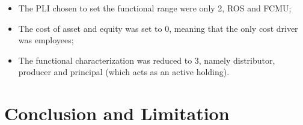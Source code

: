 \documentclass{article}
\begin{document}
\begin{itemize}
    \item The PLI chosen to set the functional range were only 2, ROS and FCMU;
    \item The cost of asset and equity was set to 0, meaning that the only cost driver was employees;
    \item The functional characterization was reduced to 3, namely distributor, producer and principal (which acts as an active holding).
\end{itemize}


\section{Conclusion and Limitation}


\newpage
\printbibliography
\end{document}
